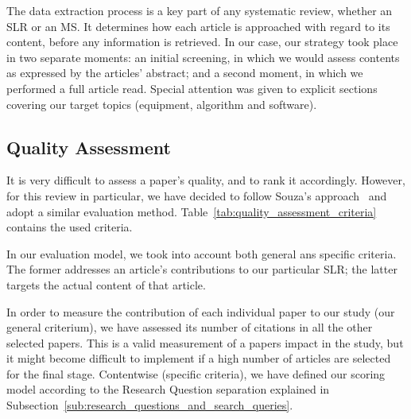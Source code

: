 The data extraction process is a key part of any systematic review,
whether an SLR or an MS. It determines how each article is approached
with regard to its content, before any information is retrieved. In our
case, our strategy took place in two separate moments: an initial
screening, in which we would assess contents as expressed by the
articles' abstract; and a second moment, in which we performed a full
article read. Special attention was given to explicit sections covering
our target topics (equipment, algorithm and software). 


\subsection{Quality Assessment}
\label{sub:quality_assessment}

It is very difficult to assess a paper's quality, and to rank it
accordingly. However, for this review in particular, we have decided to
follow Souza's approach~\cite{Souza2019} and adopt a similar evaluation
method.  Table~\ref{tab:quality_assessment_criteria} contains the used
criteria. 

In our evaluation model, we took into account both general ans specific
criteria. The former addresses an article's contributions to our
particular SLR; the latter targets the actual content of that article. 

In order to measure the contribution of each individual paper to our
study (our general criterium), we have assessed its number of citations
in all the other selected papers. This is a valid measurement of a
papers impact in the study, but it might become difficult to implement
if a high number of articles are selected for the final stage.
Contentwise (specific criteria), we have defined our scoring model
according to the Research Question separation explained in
Subsection~\ref{sub:research_questions_and_search_queries}.

